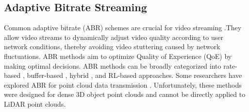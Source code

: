 \subsection{Adaptive Bitrate Streaming}
Common adaptive bitrate (ABR) schemes are crucial 
for video streaming \cite{survey}.They allow 
video streams to dynamically adjust video quality 
according to user network conditions, thereby 
avoiding video stuttering caused by network 
fluctuations. 
ABR methods aim to optimize Quality of Experience (QoE) 
by making optimal decisions. 
ABR methods can be broadly categorized 
into rate-based \cite{festive}, 
buffer-based \cite{bola}, hybrid \cite{mpc}, and 
RL-based \cite{rl} approaches.
Some researchers have explored ABR 
for point cloud data transmission 
\cite{c16}\cite{c17}. 
Unfortunately, these methods were designed for 
dense 3D object point clouds and cannot be directly 
applied to LiDAR point clouds.